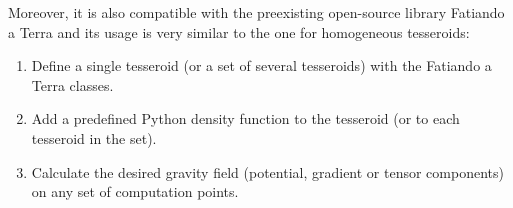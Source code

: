 \documentclass[extra]{gji}
\begin{document}
Moreover, it is also compatible with the preexisting open-source library Fatiando a Terra and its usage is very similar to the one for homogeneous tesseroids:

\begin{enumerate}
\renewcommand{\theenumi}{(\arabic{enumi})}
    \item Define a single tesseroid (or a set of several tesseroids) with the Fatiando a Terra classes.
    \item Add a predefined Python density function to the tesseroid (or to each tesseroid in the set).
    \item Calculate the desired gravity field (potential, gradient or tensor components) on any set of computation points.
\end{enumerate}








\end{document}
